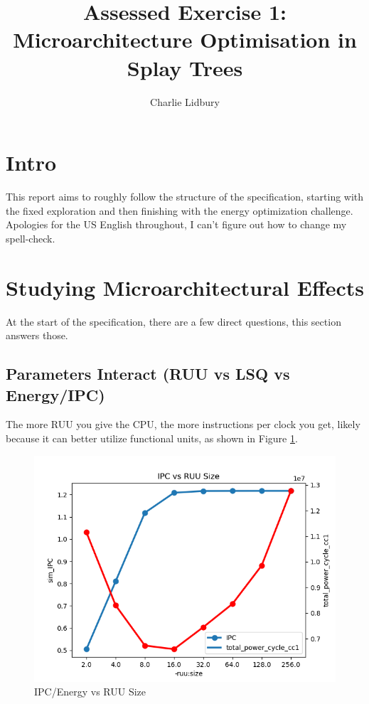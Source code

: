 \documentclass{article}
\begin{document}
\title{Assessed Exercise 1: Microarchitecture Optimisation in Splay Trees}
\author{Charlie Lidbury}
\maketitle

\begin{multicols}{2}

  \section{Intro}
  This report aims to roughly follow the structure of the specification, starting with the fixed exploration and then finishing with the energy optimization challenge. Apologies for the US English throughout, I can't figure out how to change my spell-check.

  \section{Studying Microarchitectural Effects}
  At the start of the specification, there are a few direct questions, this section answers those.

  \subsection{Parameters Interact (RUU vs LSQ vs Energy/IPC)}

  The more RUU you give the CPU, the more instructions per clock you get, likely because it can better utilize functional units, as shown in Figure \ref{fig:ipc_energy_vs_ruu}.

  \begin{figure}[H]
    \centering
    \includegraphics[width=\linewidth]{./assets/ipc_vs_ruu_size.png}
    \caption{IPC/Energy vs RUU Size}
    \label{fig:ipc_energy_vs_ruu}
  \end{figure}


\end{multicols}
\end{document}
